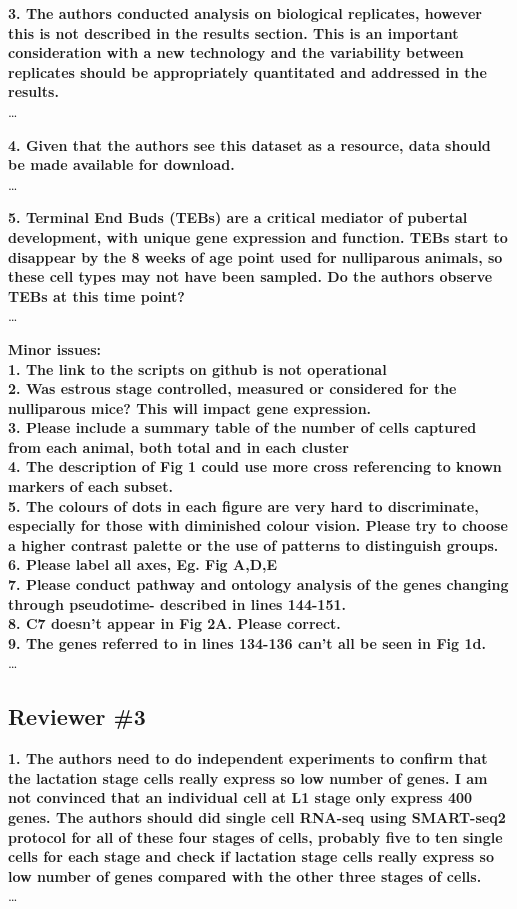 \documentclass{article}
\begin{document}
\textbf{3. The authors conducted analysis on biological replicates, however this is not described in the results section. This is an important consideration with a new technology and the variability between replicates should be appropriately quantitated and addressed in the results. }\\
\ldots

\textbf{4. Given that the authors see this dataset as a resource, data should be made available for download.}\\
\ldots

\textbf{5. Terminal End Buds (TEBs) are a critical mediator of pubertal development, with unique gene expression and function. TEBs start to disappear by the 8 weeks of age point used for nulliparous animals, so these cell types may not have been sampled. Do the authors observe TEBs at this time point?}\\
\ldots

\textbf{Minor issues: \\
1. The link to the scripts on github is not operational \\ 
2. Was estrous stage controlled, measured or considered for the nulliparous mice? This will impact gene expression. \\
3. Please include a summary table of the number of cells captured from each animal, both total and in each cluster \\
4. The description of Fig 1 could use more cross referencing to known markers of each subset. \\
5. The colours of dots in each figure are very hard to discriminate, especially for those with diminished colour vision. Please try to choose a higher contrast palette or the use of patterns to distinguish groups. \\
6. Please label all axes, Eg. Fig A,D,E \\
7. Please conduct pathway and ontology analysis of the genes changing through pseudotime- described in lines 144-151. \\
8. C7 doesn’t appear in Fig 2A. Please correct. \\
9. The genes referred to in lines 134-136 can’t all be seen in Fig 1d.}\\
\ldots


\subsection*{Reviewer \#3}
\textbf{1. The authors need to do independent experiments to confirm that the lactation stage cells really express so low number of genes. I am not convinced that an individual cell at L1 stage only express 400 genes. The authors should did single cell RNA-seq using SMART-seq2 protocol for all of these four stages of cells, probably five to ten single cells for each stage and check if lactation stage cells really express so low number of genes compared with the other three stages of cells.}\\
\ldots
\end{document}
